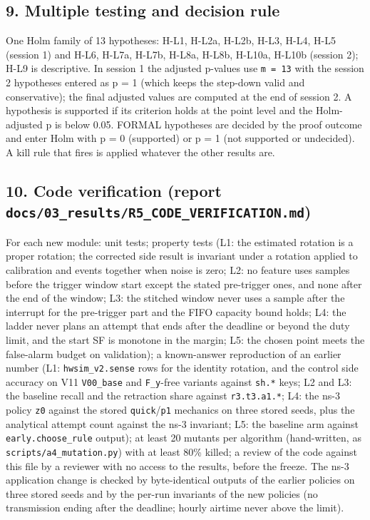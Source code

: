 \subsection*{9. Multiple testing and decision rule}

One Holm family of 13 hypotheses: H-L1, H-L2a, H-L2b, H-L3, H-L4, H-L5 (session 1) and H-L6, H-L7a, H-L7b, H-L8a, H-L8b, H-L10a, H-L10b (session 2); H-L9 is descriptive. In session 1 the adjusted p-values use \texttt{m = 13} with the session 2 hypotheses entered as p = 1 (which keeps the step-down valid and conservative); the final adjusted values are computed at the end of session 2. A hypothesis is supported if its criterion holds at the point level and the Holm-adjusted p is below 0.05. FORMAL hypotheses are decided by the proof outcome and enter Holm with p = 0 (supported) or p = 1 (not supported or undecided). A kill rule that fires is applied whatever the other results are.

\subsection*{10. Code verification (report \texttt{docs/03\_results/R5\_CODE\_VERIFICATION.md})}

For each new module: unit tests; property tests (L1: the estimated rotation is a proper rotation; the corrected side result is invariant under a rotation applied to calibration and events together when noise is zero; L2: no feature uses samples before the trigger window start except the stated pre-trigger ones, and none after the end of the window; L3: the stitched window never uses a sample after the interrupt for the pre-trigger part and the FIFO capacity bound holds; L4: the ladder never plans an attempt that ends after the deadline or beyond the duty limit, and the start SF is monotone in the margin; L5: the chosen point meets the false-alarm budget on validation); a known-answer reproduction of an earlier number (L1: \texttt{hwsim\_v2.sense} rows for the identity rotation, and the control side accuracy on V11 \texttt{V00\_base} and \texttt{F\_y}-free variants against \texttt{sh.*} keys; L2 and L3: the baseline recall and the retraction share against \texttt{r3.t3.a1.*}; L4: the ns-3 policy \texttt{z0} against the stored \texttt{quick}/\texttt{p1} mechanics on three stored seeds, plus the analytical attempt count against the ns-3 invariant; L5: the baseline arm against \texttt{early.choose\_rule} output); at least 20 mutants per algorithm (hand-written, as \texttt{scripts/a4\_mutation.py}) with at least 80\% killed; a review of the code against this file by a reviewer with no access to the results, before the freeze. The ns-3 application change is checked by byte-identical outputs of the earlier policies on three stored seeds and by the per-run invariants of the new policies (no transmission ending after the deadline; hourly airtime never above the limit).

